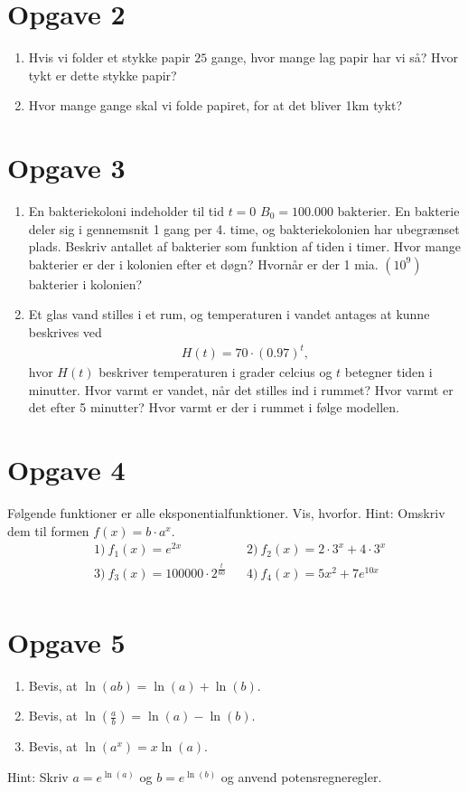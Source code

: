 \section*{Opgave 2}
\begin{enumerate}[label=\roman*)]
\item Hvis vi folder et stykke papir $25$ gange, hvor mange lag papir har vi så? Hvor tykt er dette stykke papir?
\item Hvor mange gange skal vi folde papiret, for at det bliver 1km tykt?
\end{enumerate}
\section*{Opgave 3}
\begin{enumerate}[label=\roman*)]
\item En bakteriekoloni indeholder til tid $t=0$ $B_0 = 100.000$ bakterier. En bakterie deler sig i gennemsnit 1 gang per 4. time, og bakteriekolonien har ubegrænset plads. Beskriv antallet af bakterier som funktion af tiden i timer. Hvor mange bakterier er der i kolonien efter et døgn? Hvornår er der 1 mia. $(10^9)$ bakterier i kolonien?
\item Et glas vand stilles i et rum, og temperaturen i vandet antages at kunne beskrives ved
\begin{align*}
H(t) = 70\cdot(0.97)^t,
\end{align*}
hvor $H(t)$ beskriver temperaturen i grader celcius og $t$ betegner tiden i minutter. Hvor varmt er vandet, når det stilles ind i rummet? Hvor varmt er det efter 5 minutter? Hvor varmt er der i rummet i følge modellen. 
\end{enumerate}

\section*{Opgave 4}
Følgende funktioner er alle eksponentialfunktioner. Vis, hvorfor. Hint: Omskriv dem til formen $f(x) = b\cdot a^x$. 
\begin{align*}
&1) \ f_1(x) = e^{2x}    &&2) \  f_2(x) = 2\cdot 3^x + 4\cdot 3^x  \\
&3) \ f_3(x) =  100000\cdot 2^{\frac{t}{60}}  &&4) \ f_4(x) = 5x^2 +7e^{10x}    \\
\end{align*}

\section*{Opgave 5}
\begin{enumerate}[label=\roman*)]
\item Bevis, at  $\ln(ab) = \ln(a)+\ln(b).$
\item Bevis, at  $\ln(\frac{a}{b}) = \ln(a)-\ln(b)$.
\item Bevis, at  $\ln(a^x) = x\ln(a)$.
\end{enumerate}
Hint: Skriv $a = e^{\ln(a)}$ og $b=e^{\ln(b)}$ og anvend potensregneregler. 

